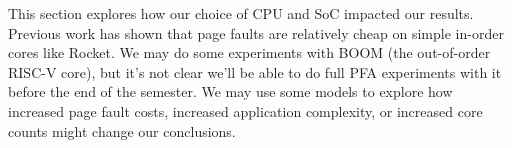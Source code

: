 This section explores how our choice of CPU and SoC impacted our results. Previous work has shown that page faults are relatively cheap on simple in-order cores like Rocket. We may do some experiments with BOOM (the out-of-order RISC-V core), but it's not clear we'll be able to do full PFA experiments with it before the end of the semester. We may use some models to explore how increased page fault costs, increased application complexity, or increased core counts might change our conclusions.